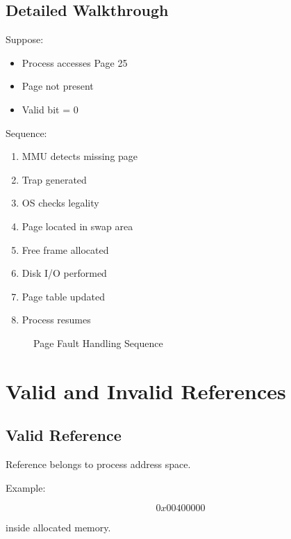 \subsection{Detailed Walkthrough}

Suppose:

\begin{itemize}
\item Process accesses Page 25
\item Page not present
\item Valid bit = 0
\end{itemize}

Sequence:

\begin{enumerate}
\item MMU detects missing page
\item Trap generated
\item OS checks legality
\item Page located in swap area
\item Free frame allocated
\item Disk I/O performed
\item Page table updated
\item Process resumes
\end{enumerate}

\begin{figure}[H]
\centering
{}
\caption{Page Fault Handling Sequence}
\end{figure}

\section{Valid and Invalid References}

\subsection{Valid Reference}

Reference belongs to process address space.

Example:

\[
0x00400000
\]

inside allocated memory.

